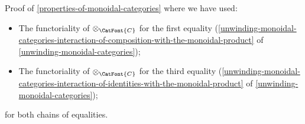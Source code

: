 \begin{Proof}{Proof of \cref{properties-of-monoidal-categories}}
    where we have used:
    \begin{itemize}
        \item The functoriality of $\otimes_{\CatFont{C}}$ for the first equality (\cref{unwinding-monoidal-categories-interaction-of-composition-with-the-monoidal-product} of \cref{unwinding-monoidal-categories});
        \item The functoriality of $\otimes_{\CatFont{C}}$ for the third equality (\cref{unwinding-monoidal-categories-interaction-of-identities-with-the-monoidal-product} of \cref{unwinding-monoidal-categories});
    \end{itemize}
    for both chains of equalities.


\end{Proof}
